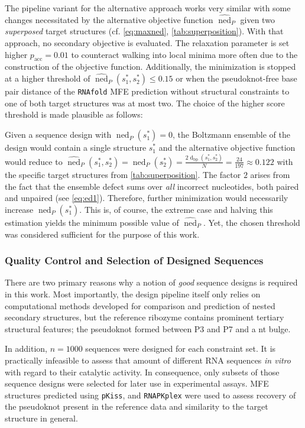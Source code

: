 \documentclass[../../master.tex]{subfiles}
\begin{document}
The pipeline variant for the alternative approach works very similar with some changes necessitated by the alternative objective function $\widehat{\operatorname{ned}}_P$ given two \emph{superposed} target structures (cf. \autoref{eq:maxned}, \autoref{tab:superposition}).
With that approach, no secondary objective is evaluated.
The relaxation parameter is set higher $p_\mathrm{acc} = 0.01$ to counteract walking into local minima more often due to the construction of the objective function.
Additionally, the minimization is stopped at a higher threshold of $\widehat{\operatorname{ned}}_P(s_1^*, s_2^*) \leq 0.15$ or when the pseudoknot-free base pair distance of the \texttt{RNAfold} MFE prediction without structural constraints to one of both target structures was at most two.
The choice of the higher score threshold is made plausible as follows:

Given a sequence design with $\operatorname{ned}_P(s_1^*) = 0$, the Boltzmann ensemble of the design would contain a single structure $s_1^*$ and the alternative objective function would reduce to $\widehat{\operatorname{ned}}_P(s_1^*, s_2^*) = \operatorname{ned}_P(s_2^*) = \frac{2 \operatorname{d}_\mathrm{bp}(s_1^*, s_2^*)}{N} = \frac{24}{197} \approx 0.122$ with the specific target structures from \autoref{tab:superposition}.
The factor $2$ arises from the fact that the ensemble defect sums over \emph{all} incorrect nucleotides, both paired and unpaired (see \autoref{eq:ed1}).
Therefore, further minimization would necessarily increase $\operatorname{ned}_P(s_1^*)$.
This is, of course, the extreme case and halving this estimation yields the minimum possible value of $\widehat{\operatorname{ned}}_P$.
Yet, the chosen threshold was considered sufficient for the purpose of this work.


\subsubsection{Quality Control and Selection of Designed Sequences}
\label{ssub:methods:selection}

There are two primary reasons why a notion of \emph{good} sequence designs is required in this work.
Most importantly, the design pipeline itself only relies on computational methods developed for comparison and prediction of nested secondary structures, but the reference ribozyme contains prominent tertiary structural features; the pseudoknot formed between P3 and P7 and a \unit[1]{nt} bulge.

In addition, $n = 1000$ sequences were designed for each constraint set.
It is practically infeasible to assess that amount of different RNA sequences \textit{in vitro} with regard to their catalytic activity.
In consequence, only subsets of those sequence designs were selected for later use in experimental assays. 
MFE structures predicted using \texttt{pKiss}, and \texttt{RNAPKplex} were used to assess recovery of the pseudoknot present in the reference data and similarity to the target structure in general.
\end{document}
